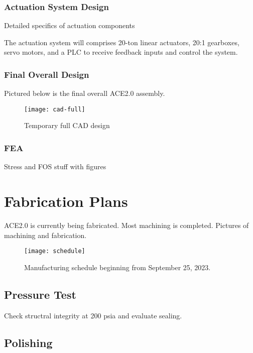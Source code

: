 \subsubsection{Actuation System Design}

Detailed specifics of actuation components

The actuation system will comprises 20-ton linear actuators, 20:1 gearboxes, servo motors, and a PLC to receive feedback inputs and control the system.

\subsubsection{Final Overall Design}

Pictured below is the final overall ACE2.0 assembly.

\begin{figure}[ht!]
    \centering
    \texttt{[image: cad-full]}
    \caption{Temporary full CAD design}
    \label{fig:cad-full}
\end{figure}

\subsubsection{FEA}

Stress and FOS stuff with figures

\section{Fabrication Plans}

ACE2.0 is currently being fabricated. Most machining is completed. Pictures of machining and fabrication.

\begin{figure}[ht!]
    \centering
    \texttt{[image: schedule]}
    \caption{Manufacturing schedule beginning from September 25, 2023.}
    \label{fig:schedule}
\end{figure}

\subsection{Pressure Test}

Check structral integrity at 200 psia and evaluate sealing.

\subsection{Polishing}

